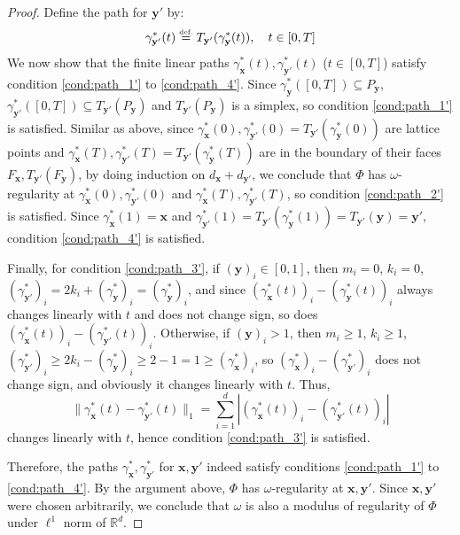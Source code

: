 \documentclass{article}
\numberwithin{equation}{section}
\theoremstyle{definition}
\newcommand{\eqdef}{\ensuremath{\stackrel{\mbox{\upshape\tiny def.}}{=}}}
\begin{document}
\begin{proof}
Define the path for $\mathbf{y}'$ by:
$$\gamma_{\mathbf{y}'}^{\ast}(t)  \eqdef  
T_{\mathbf{y}'} ( \gamma_{\mathbf{y}}^{\ast}(t) ),
\quad t\in[0,T]$$
We now show that the finite linear paths $\gamma_{\mathbf{x}}^{\ast}(t),\gamma_{\mathbf{y}'}^{\ast}(t)$ ($t\in[0,T]$) satisfy condition \ref{cond:path_1'} to \ref{cond:path_4'}. Since $\gamma_{\mathbf{y}}^{\ast}([0,T]) \subseteq P_{\mathbf{y}}$, $\gamma_{\mathbf{y}'}^{\ast}([0,T]) \subseteq T_{\mathbf{y}'}(P_{\mathbf{y}})$ and $T_{\mathbf{y}'}(P_{\mathbf{y}})$ is a simplex, so condition \ref{cond:path_1'} is satisfied. Similar as above, since $\gamma_{\mathbf{x}}^{\ast}(0),\gamma_{\mathbf{y}'}^{\ast}(0) = T_{\mathbf{y}'} ( \gamma_{\mathbf{y}}^{\ast}(0) )$ are lattice points and $\gamma_{\mathbf{x}}^{\ast}(T),\gamma_{\mathbf{y}'}^{\ast}(T) = T_{\mathbf{y}'} ( \gamma_{\mathbf{y}}^{\ast}(T) )$ are in the boundary of their faces $F_{\mathbf{x}},T_{\mathbf{y}'}(F_{\mathbf{y}})$, by doing induction on $d_{\mathbf{x}}+d_{\mathbf{y}'}$, we conclude that $\Phi$ has $\omega$-regularity at $\gamma_{\mathbf{x}}^{\ast}(0),\gamma_{\mathbf{y}'}^{\ast}(0)$ and $\gamma_{\mathbf{x}}^{\ast}(T),\gamma_{\mathbf{y}'}^{\ast}(T)$, so condition \ref{cond:path_2'} is satisfied. Since $\gamma_{\mathbf{x}}^{\ast}(1) = \mathbf{x}$ and $\gamma_{\mathbf{y}'}^{\ast}(1) = T_{\mathbf{y}'} ( \gamma_{\mathbf{y}}^{\ast}(1) ) = T_{\mathbf{y}'}(\mathbf{y}) = \mathbf{y}'$, condition \ref{cond:path_4'} is satisfied.

Finally, for condition \ref{cond:path_3'}, if $(\mathbf{y})_i \in [0,1]$, then $m_i = 0$, $k_i = 0$, $(\gamma_{\mathbf{y}'}^{\ast})_i = 2k_i + (\gamma_{\mathbf{y}}^{\ast})_i = (\gamma_{\mathbf{y}}^{\ast})_i$, and since $(\gamma_{\mathbf{x}}^{\ast}(t))_i - (\gamma_{\mathbf{y}}^{\ast}(t))_i$ always changes linearly with $t$ and does not change sign, so does $(\gamma_{\mathbf{x}}^{\ast}(t))_i - (\gamma_{\mathbf{y}'}^{\ast}(t))_i$. Otherwise, if $(\mathbf{y})_i > 1$, then $m_i \ge 1$, $k_i \ge 1$, $(\gamma_{\mathbf{y}'}^{\ast})_i \ge 2k_i - (\gamma_{\mathbf{y}}^{\ast})_i \ge 2 - 1 = 1 \ge (\gamma_{\mathbf{x}}^{\ast})_i$, so $(\gamma_{\mathbf{x}}^{\ast})_i - (\gamma_{\mathbf{y}'}^{\ast})_i$ does not change sign, and obviously it changes linearly with $t$. Thus, 
$$\| \gamma_{\mathbf{x}}^{\ast}(t) - \gamma_{\mathbf{y}'}^{\ast}(t) \|_1 = 
\sum_{i=1}^d |(\gamma_{\mathbf{x}}^{\ast}(t))_i - (\gamma_{\mathbf{y}'}^{\ast}(t))_i|$$
changes linearly with $t$, hence condition \ref{cond:path_3'} is satisfied.

Therefore, the paths $\gamma_{\mathbf{x}}^{\ast},\gamma_{\mathbf{y}'}^{\ast}$ for $\mathbf{x},\mathbf{y}'$ indeed satisfy conditions \ref{cond:path_1'} to \ref{cond:path_4'}.
By the argument above, $\Phi$ has $\omega$-regularity at $\mathbf{x},\mathbf{y}'$. Since $\mathbf{x},\mathbf{y}'$ were chosen arbitrarily, we conclude that $\omega$ is also a modulus of regularity of $\Phi$ under $\ell^1$ norm of $\mathbb{R}^d$.


\end{proof}
\end{document}
